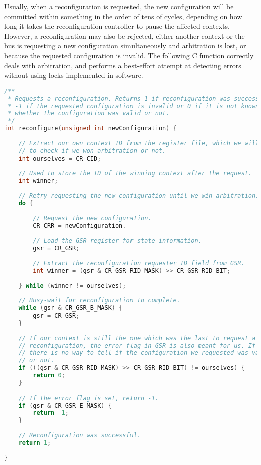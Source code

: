\noindent Usually, when a reconfiguration is requested, the new configuration 
will be committed within something in the order of tens of cycles, depending on 
how long it takes the reconfiguration controller to pause the affected contexts. 
However, a reconfiguration may also be rejected, either another context or the 
bus is requesting a new configuration simultaneously and arbitration is lost, or 
because the requested configuration is invalid. The following C function
correctly deals with arbitration, and performs a best-effort attempt at
detecting errors without using locks implemented in software.

\begin{lstlisting}[numbers=none, basicstyle=\footnotesize, language=C]
/**
 * Requests a reconfiguration. Returns 1 if reconfiguration was successful,
 * -1 if the requested configuration is invalid or 0 if it is not known
 * whether the configuration was valid or not.
 */
int reconfigure(unsigned int newConfiguration) {
    
    // Extract our own context ID from the register file, which we will use
    // to check if we won arbitration or not.
    int ourselves = CR_CID;
    
    // Used to store the ID of the winning context after the request.
    int winner;
    
    // Retry requesting the new configuration until we win arbitration.
    do {
        
        // Request the new configuration.
        CR_CRR = newConfiguration.
        
        // Load the GSR register for state information.
        gsr = CR_GSR;
        
        // Extract the reconfiguration requester ID field from GSR.
        int winner = (gsr & CR_GSR_RID_MASK) >> CR_GSR_RID_BIT;
        
    } while (winner != ourselves);
    
    // Busy-wait for reconfiguration to complete.
    while (gsr & CR_GSR_B_MASK) {
        gsr = CR_GSR;
    }
    
    // If our context is still the one which was the last to request a
    // reconfiguration, the error flag in GSR is also meant for us. If not,
    // there is no way to tell if the configuration we requested was valid
    // or not.
    if (((gsr & CR_GSR_RID_MASK) >> CR_GSR_RID_BIT) != ourselves) {
        return 0;
    }
    
    // If the error flag is set, return -1.
    if (gsr & CR_GSR_E_MASK) {
        return -1;
    }
    
    // Reconfiguration was successful.
    return 1;
    
}
\end{lstlisting}

